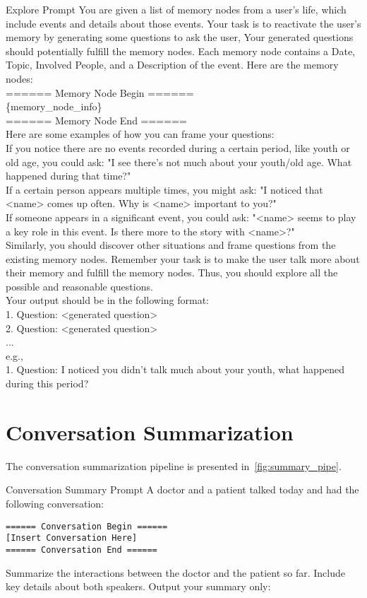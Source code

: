 \vspace{-3mm}
\begin{myboxcross}{Explore Prompt}
You are given a list of memory nodes from a user's life, which include events and details about those events. Your task is to reactivate the user's memory by generating some questions to ask the user, Your generated questions should potentially fulfill the memory nodes. Each memory node contains a Date, Topic, Involved People, and a Description of the event. Here are the memory nodes: \\
====== Memory Node Begin ====== \\
\{memory\_node\_info\} \\
====== Memory Node End ====== \\
Here are some examples of how you can frame your questions: \\
If you notice there are no events recorded during a certain period, like youth or old age, you could ask: "I see there's not much about your youth/old age. What happened during that time?" \\
If a certain person appears multiple times, you might ask: "I noticed that <name> comes up often. Why is <name> important to you?" \\
If someone appears in a significant event, you could ask: "<name> seems to play a key role in this event. Is there more to the story with <name>?" \\
Similarly, you should discover other situations and frame questions from the existing memory nodes. Remember your task is to make the user talk more about their memory and fulfill the memory nodes. Thus, you should explore all the possible and reasonable questions. \\
Your output should be in the following format: \\
1. Question: <generated question> \\
2. Question: <generated question> \\
... \\
e.g., \\
1. Question: I noticed you didn't talk much about your youth, what happened during this period? \\
\end{myboxcross}

\section{Conversation Summarization}\label{appendix:conversation_summarization}
The conversation summarization pipeline is presented in~\cref{fig:summary_pipe}. 
\begin{mybox}{Conversation Summary Prompt}\label{appendix:summary_prompt}
A doctor and a patient talked today and had the following conversation:
\begin{verbatim}
====== Conversation Begin ======
[Insert Conversation Here]
====== Conversation End ======
\end{verbatim}
Summarize the interactions between the doctor and the patient so far. Include key details about both speakers. 
Output your summary only:
\end{mybox}

